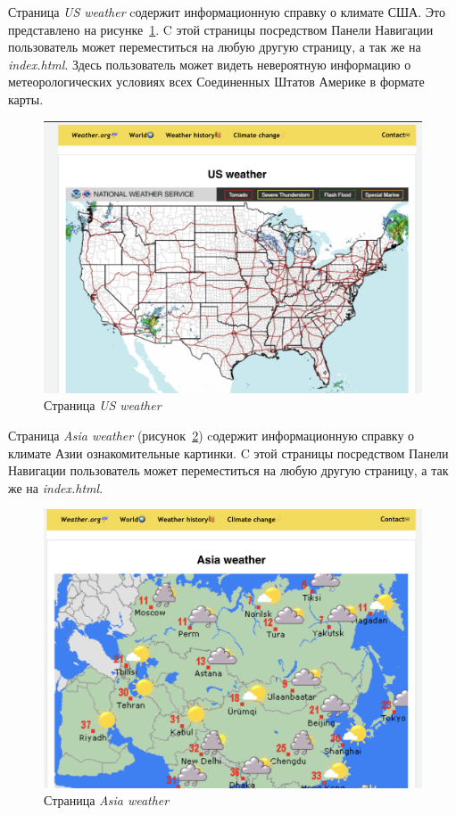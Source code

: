 \documentclass[a4paper,hidelinks,14pt]{extarticle}
\begin{document}
\clearpage


Страница \textit{US weather} cодержит информационную справку о климате США. Это представлено на рисунке~\ref{fig:fig7}. C этой страницы посредством Панели Навигации пользователь может переместиться на любую другую страницу, а так же на\textit{ index.html}. Здесь пользователь может видеть невероятную информацию о метеорологических условиях всех Соединенных Штатов Америке в формате карты.

\begin{figure}[htbp]
    \centering
    \includegraphics[scale=0.4]{fig/w_usa.png}
    \caption{Страница \textit{US weather}}
    \label{fig:fig7}
\end{figure}

Страница \textit{Asia weather} (рисунок~\ref{fig:fig8}) cодержит информационную справку о климате Азии ознакомительные картинки. C этой страницы посредством Панели Навигации пользователь может переместиться на любую другую страницу, а так же на\textit{ index.html}.

\begin{figure}[htbp]
    \centering
    \includegraphics[scale=0.4]{fig/w_asia.png}
    \caption{Страница \textit{Asia weather}}
    \label{fig:fig8}
\end{figure}
\end{document}

